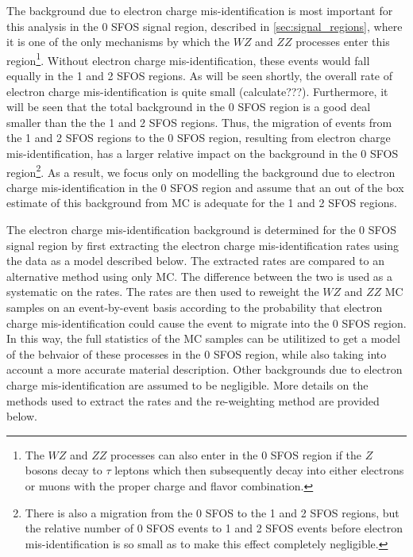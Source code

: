 The background due to electron charge mis-identification is most important 
for this analysis
in the 0 SFOS signal region, described in \sec\ref{sec:signal_regions},
where it is one of the only mechanisms by which the $WZ$ and $ZZ$ 
processes enter this region\footnote{The $WZ$ and $ZZ$ processes
can also enter in the 0 SFOS region if the $Z$ bosons
decay to $\tau$ leptons which then subsequently decay into 
either electrons or muons with the proper charge and flavor combination.}.
Without electron charge mis-identification, these events would fall
equally in the 1 and 2 SFOS regions.
As will be seen shortly, the overall rate of electron charge mis-identification
is quite small (calculate???). 
Furthermore, it will be seen that the total background in the 0 SFOS region is 
a good deal smaller than the the 1 and 2 SFOS regions. Thus, the
migration of events from the 1 and 2 SFOS regions to the 0 SFOS 
region, resulting from electron charge mis-identification, has
a larger relative impact on the background in the 0 SFOS 
region\footnote{There is also a migration from the 0 SFOS to the 1 and 2 SFOS 
regions, but the relative number of 0 SFOS events to 1 and 2 SFOS
events before electron mis-identification is so small as to make this
effect completely negligible.}.
As a result, we focus only on modelling the background due to electron
charge mis-identification in the 0 SFOS region and assume that an 
out of the box estimate of this background from MC is adequate for the 
1 and 2 SFOS regions.


The electron charge mis-identification background is determined
for the 0 SFOS signal region by first extracting the electron charge
mis-identification rates using the data as a model
described below. The extracted
rates are compared to an alternative method using only MC. 
The difference between the two is used as a systematic on the
rates. The rates are then used to reweight the $WZ$ and $ZZ$ MC samples
on an event-by-event basis 
according to the probability that electron charge mis-identification
could cause the event to migrate into the 0 SFOS region. In this way, 
the full statistics of the MC samples can be utilitized to get a model of
the behvaior of these processes in the 0 SFOS region, while also taking 
into account a more accurate material description. Other backgrounds
due to electron charge mis-identification are assumed to be negligible.
More details on the methods used to extract the rates and the re-weighting
method are provided below.




